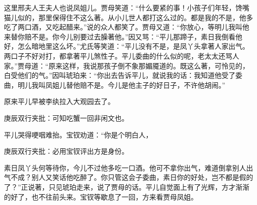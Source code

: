 \begin{parag}


    这里邢夫人王夫人也说凤姐儿。贾母笑道：“什么要紧的事！小孩子们年轻，馋嘴猫儿似的，那里保得住不这么著。从小儿世人都打这么过的。都是我的不是，他多吃了两口酒，又吃起醋来。”说的众人都笑了。贾母又道：“你放心，等明儿我叫他来替你赔不是。你今儿别要过去臊著他。”因又骂：“平儿那蹄子，素日我倒看他好，怎么暗地里这么坏。”尤氏等笑道：“平儿没有不是，是凤丫头拿著人家出气。两口子不好对打，都拿著平儿煞性子。平儿委曲的什么似的呢，老太太还骂人家。”贾母道：“原来这样，我说那孩子倒不象那媚魇道的。既这么著，可怜见的，白受他们的气。”因叫琥珀来：“你出去告诉平儿，就说我的话：我知道他受了委曲，明儿我叫凤姐儿替他赔不是。今儿是他主子的好日子，不许他胡闹。”
\end{parag}


\begin{parag}


    原来平儿早被李纨拉入大观园去了。\begin{note}庚辰双行夹批：可知吃蟹一回非闲文也。\end{note}平儿哭得哽咽难抬。宝钗劝道：“你是个明白人，\begin{note}庚辰双行夹批：必用宝钗评出方是身份。\end{note}素日凤丫头何等待你，今儿不过他多吃一口酒。他可不拿你出气，难道倒拿别人出气不成？别人又笑话他吃醉了。你只管这会子委曲，素日你的好处，岂不都是假的了？”正说著，只见琥珀走来，说了贾母的话。平儿自觉面上有了光辉，方才渐渐的好了，也不往前头来。宝钗等歇息了一回，方来看贾母凤姐。
\end{parag}


